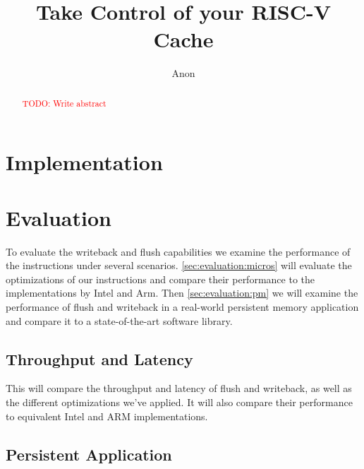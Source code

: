 \documentclass[pageno,hyperref]{jpaper}
\newcommand{\TODO}[1]{\textcolor{red}{TODO: #1}}
\newcommand{\wb}[0]{writeback}
\newcommand{\fl}[0]{flush}
\begin{document}
\title{
Take Control of your RISC-V Cache}

\author{Anon}

\date{}
\maketitle

\thispagestyle{empty}

\begin{abstract}

\TODO{Write abstract}

\end{abstract}









\section{Implementation}
\label{sec:implementation}

\section{Evaluation}
\label{sec:evaluation}

To evaluate the \wb{} and \fl{} capabilities we examine the performance of the instructions under several scenarios.
\autoref{sec:evaluation:micros} will evaluate the optimizations of our instructions and compare their performance to the implementations by Intel and Arm.
Then \autoref{sec:evaluation:pm} we will examine the performance of \fl{} and \wb{} in a real-world persistent memory application and compare it to a state-of-the-art software library. 

\subsection{Throughput and Latency}
\label{sec:evaluation:micros}

This will compare the throughput and latency of \fl{} and \wb{}, as well as the different optimizations we've applied. 
It will also compare their performance to equivalent Intel and ARM implementations.

\subsection{Persistent Application}
\label{sec:evaluation:pm}
\end{document}
